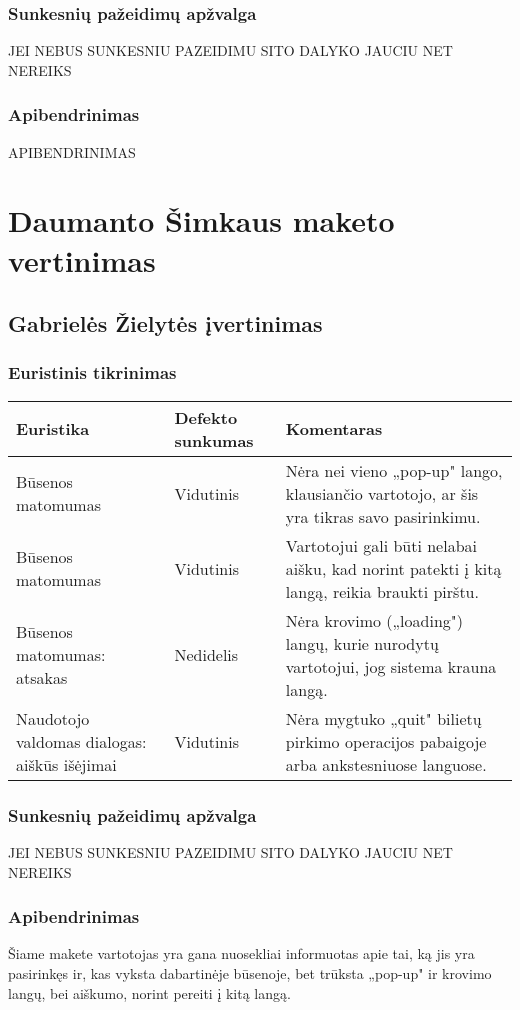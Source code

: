 \documentclass{VUMIFPSkursinis}
\begin{document}
\subsubsection{Sunkesnių pažeidimų apžvalga}
JEI NEBUS SUNKESNIU PAZEIDIMU SITO DALYKO JAUCIU NET NEREIKS

\subsubsection{Apibendrinimas}
APIBENDRINIMAS

\section{Daumanto Šimkaus maketo vertinimas}
\subsection{Gabrielės Žielytės įvertinimas}
\subsubsection{Euristinis tikrinimas}
\begin{center}
 \begin{tabular}{|| p{4cm} | p{4cm} | p{8cm} ||} 
 \hline
 Euristika & Defekto sunkumas & Komentaras \\
 \hline\hline
 Būsenos matomumas & Vidutinis & Nėra nei vieno „pop-up" lango, klausiančio vartotojo, ar šis yra tikras savo pasirinkimu.\\ 
 \hline
 Būsenos matomumas & Vidutinis & Vartotojui gali būti nelabai aišku, kad norint patekti į kitą langą, reikia braukti pirštu.\\
 \hline
 Būsenos matomumas: atsakas & Nedidelis & Nėra krovimo („loading") langų, kurie nurodytų vartotojui, jog sistema krauna langą. \\
 \hline
 Naudotojo valdomas dialogas: aiškūs išėjimai & Vidutinis & Nėra mygtuko „quit" bilietų pirkimo operacijos pabaigoje arba ankstesniuose languose. \\
 \hline
\end{tabular}	
\end{center}

\subsubsection{Sunkesnių pažeidimų apžvalga}
JEI NEBUS SUNKESNIU PAZEIDIMU SITO DALYKO JAUCIU NET NEREIKS

\subsubsection{Apibendrinimas}
Šiame makete vartotojas yra gana nuosekliai informuotas apie tai, ką jis yra pasirinkęs ir, kas vyksta dabartinėje būsenoje, bet trūksta „pop-up" ir krovimo langų, bei aiškumo, norint pereiti į kitą langą.
\end{document}
